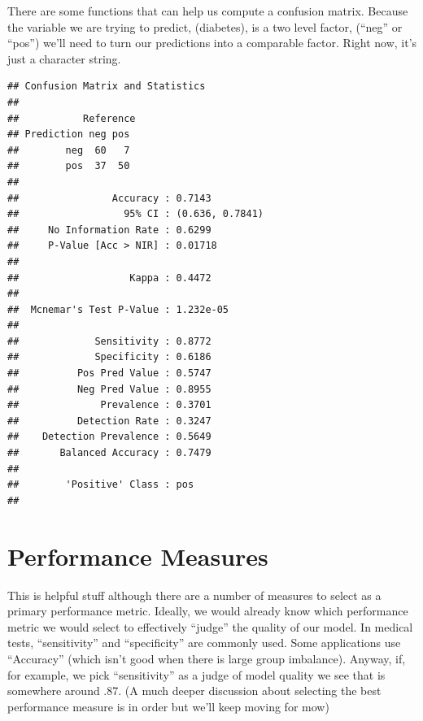 \documentclass[]{book}
\newenvironment{Shaded}{\begin{snugshade}}{\end{snugshade}}
\newcommand{\KeywordTok}[1]{\textcolor[rgb]{0.13,0.29,0.53}{\textbf{#1}}}
\newcommand{\DataTypeTok}[1]{\textcolor[rgb]{0.13,0.29,0.53}{#1}}
\newcommand{\StringTok}[1]{\textcolor[rgb]{0.31,0.60,0.02}{#1}}
\newcommand{\CommentTok}[1]{\textcolor[rgb]{0.56,0.35,0.01}{\textit{#1}}}
\newcommand{\OperatorTok}[1]{\textcolor[rgb]{0.81,0.36,0.00}{\textbf{#1}}}
\newcommand{\NormalTok}[1]{#1}
\begin{document}
There are some functions that can help us compute a confusion matrix.
Because the variable we are trying to predict, (diabetes), is a two
level factor, (``neg'' or ``pos'') we'll need to turn our predictions
into a comparable factor. Right now, it's just a character string.

\begin{Shaded}
\end{Shaded}

\begin{verbatim}
## Confusion Matrix and Statistics
## 
##           Reference
## Prediction neg pos
##        neg  60   7
##        pos  37  50
##                                          
##                Accuracy : 0.7143         
##                  95% CI : (0.636, 0.7841)
##     No Information Rate : 0.6299         
##     P-Value [Acc > NIR] : 0.01718        
##                                          
##                   Kappa : 0.4472         
##                                          
##  Mcnemar's Test P-Value : 1.232e-05      
##                                          
##             Sensitivity : 0.8772         
##             Specificity : 0.6186         
##          Pos Pred Value : 0.5747         
##          Neg Pred Value : 0.8955         
##              Prevalence : 0.3701         
##          Detection Rate : 0.3247         
##    Detection Prevalence : 0.5649         
##       Balanced Accuracy : 0.7479         
##                                          
##        'Positive' Class : pos            
## 
\end{verbatim}

\section{Performance Measures}\label{performance-measures}

This is helpful stuff although there are a number of measures to select
as a primary performance metric. Ideally, we would already know which
performance metric we would select to effectively ``judge'' the quality
of our model. In medical tests, ``sensitivity'' and ``specificity'' are
commonly used. Some applications use ``Accuracy'' (which isn't good when
there is large group imbalance). Anyway, if, for example, we pick
``sensitivity'' as a judge of model quality we see that is somewhere
around .87. (A much deeper discussion about selecting the best
performance measure is in order but we'll keep moving for mow)
\end{document}
